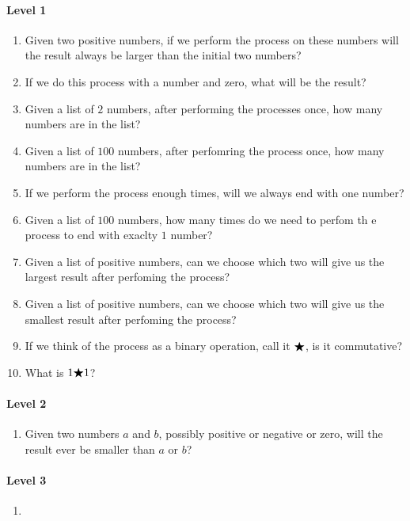 \documentclass[nooutcomes]{ximera}
\begin{document}
\begin{problem}
\begin{freeResponse}
  \paragraph{Level 1}
  \begin{enumerate}
    \item Given two positive numbers, if we perform the process on
      these numbers will the result always be larger than the initial
      two numbers?
    \item If we do this process with a number and zero, what will be
      the result?
    \item Given a list of $2$ numbers, after performing the processes
      once, how many numbers are in the list?
    \item Given a list of $100$ numbers, after perfomring the process
      once, how many numbers are in the list?
    \item If we perform the process enough times, will we always end
      with one number?
    \item Given a list of $100$ numbers, how many times do we need to
      perfom th e process to end with exaclty $1$ number?
    \item Given a list of positive numbers, can we choose which two
      will give us the largest result after perfoming the process?
    \item Given a list of positive numbers, can we choose which two
      will give us the smallest result after perfoming the process?
    \item If we think of the process as a binary operation, call it
      $\bigstar$, is it commutative?
    \item What is $1 \bigstar 1$?
  \end{enumerate}

  \paragraph{Level 2}
  \begin{enumerate}
    \item Given two numbers $a$ and $b$, possibly positive or negative
      or zero, will the result ever be smaller than $a$ or $b$?
  \end{enumerate}

  \paragraph{Level 3}
  \begin{enumerate}
    \item
  \end{enumerate}
  
\end{freeResponse}
\end{problem}
\end{document}
